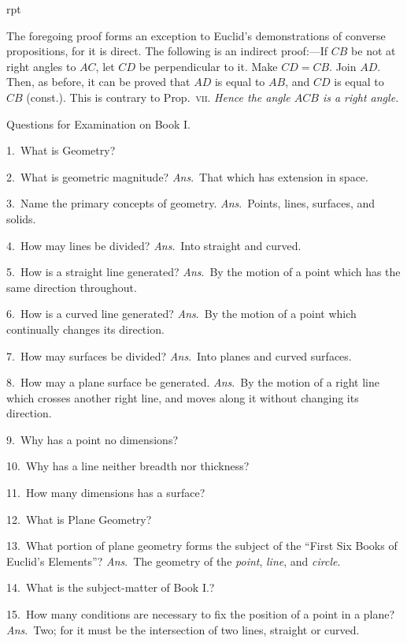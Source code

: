 \documentclass[oneside]{book}
\newcounter{wrapwidth}
\newcommand\exhead[1]{
\Needspace*{5\baselineskip}\begin{center}
\textsf{#1}
\end{center}
}
\newcommand\imgflow[3]{
\setcounter{wrapwidth}{#1}

\begin{wrapfigure}[#2]{r}{\value{wrapwidth}pt}
\begin{center}
\vspace{-0.3in}

\end{center}
\end{wrapfigure}
}
\begin{document}
\imgflow{125}{7}{f071}

\begin{footnotesize}
The foregoing proof forms an exception to Euclid's demonstrations
of converse propositions, for it
is direct. The following is an indirect
proof:---If $CB$ be not at right
angles to $AC$, let $CD$ be perpendicular
to it. Make $CD = CB$. Join $AD$.
Then, as before, it can be proved
that $AD$ is equal to $AB$, and $CD$ is
equal to $CB$ (const.). This is contrary
to Prop.~\textsc{vii}. \emph{Hence the angle $ACB$ is a right angle.}
\par\end{footnotesize}

\exhead{Questions for Examination on Book I.}

\begin{footnotesize}
1.~What is Geometry?

2.~What is geometric magnitude? \emph{Ans}.~That which has extension
in space.

3.~Name the primary concepts of geometry. \emph{Ans}.~Points,
lines, surfaces, and solids.

4.~How may lines be divided? \emph{Ans}.~Into straight and curved.

5.~How is a straight line generated? \emph{Ans}.~By the motion of
a point which has the same direction throughout.

6.~How is a curved line generated? \emph{Ans}.~By the motion of a
point which continually changes its direction.

7.~How may surfaces be divided? \emph{Ans}.~Into planes and
curved surfaces.

8.~How may a plane surface be generated. \emph{Ans}.~By the
motion of a right line which crosses another right line, and
moves along it without changing its direction.

9.~Why has a point no dimensions?

10.~Why has a line neither breadth nor thickness?

11.~How many dimensions has a surface?

12.~What is Plane Geometry?

13.~What portion of plane geometry forms the subject of the
``First Six Books of Euclid's Elements''? \emph{Ans}.~The geometry
of the \emph{point}, \emph{line}, and \emph{circle}.

14.~What is the subject-matter of Book I.?

15.~How many conditions are necessary to fix the position of a
point in a plane? \emph{Ans}.~Two; for it must be the intersection of
two lines, straight or curved.


\end{footnotesize}
\end{document}

